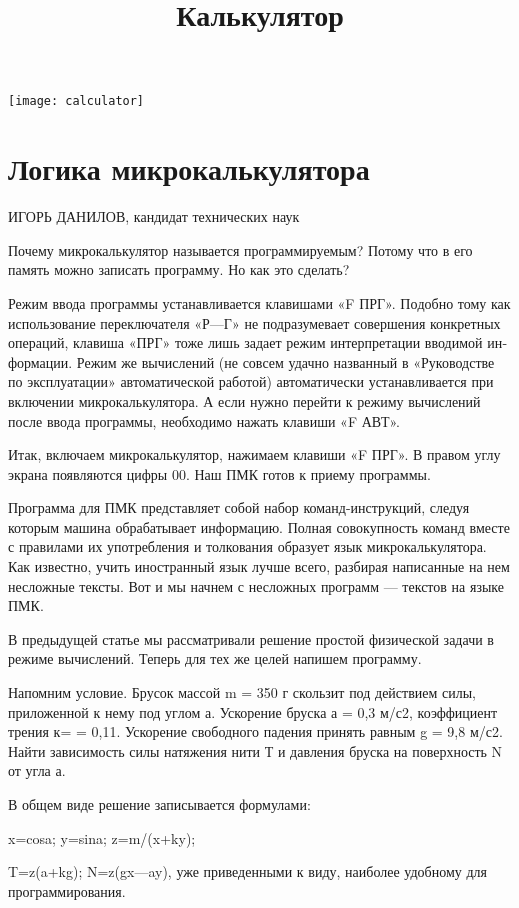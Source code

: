 \documentclass[11pt,a4paper,oneside]{article}
\title{Калькулятор}
\begin{document}
\maketitle
\tableofcontents
\pagebreak

\texttt{[image: calculator]}
\section{Логика микрокалькулятора}
ИГОРЬ ДАНИЛОВ, кандидат технических наук

Почему микрокалькулятор назы­вается программируемым? Потому что в его память можно записать программу. Но как это сделать?

Режим ввода программы устанав­ливается клавишами «F ПРГ». По­добно тому как использование пере­ключателя «Р—Г» не подразумевает совершения конкретных операций, клавиша «ПРГ» тоже лишь задает режим интерпретации вводимой ин­формации. Режим же вычислений (не совсем удачно названный в «Руко­водстве по эксплуатации» автомати­ческой работой) автоматически уста­навливается при включении микро­калькулятора. А если нужно перей­ти к режиму вычислений после вво­да программы, необходимо нажать клавиши «F АВТ».

Итак, включаем микрокалькулятор, нажимаем клавиши «F ПРГ». В пра­вом углу экрана появляются цифры 00. Наш ПМК готов к приему про­граммы.

Программа для ПМК представля­ет собой набор команд-инструкций, следуя которым машина обрабатыва­ет информацию. Полная совокуп­ность команд вместе с правилами их употребления и толкования образует язык микрокалькулятора. Как изве­стно, учить иностранный язык лучше всего, разбирая написанные на нем несложные тексты. Вот и мы начнем с несложных программ — текстов на языке ПМК.

В предыдущей статье мы рассмат­ривали решение простой физической задачи в режиме вычислений. Теперь для тех же целей напишем про­грамму.

Напомним условие. Брусок массой m = 350 г скользит под действием силы, приложенной к нему под уг­лом а. Ускорение бруска а  = 0,3 м/с2, коэффициент трения к= = 0,11. Ускорение свободного паде­ния принять равным g = 9,8 м/с2. Найти зависимость силы натяжения нити Т и давления бруска на поверх­ность N от угла а.

В общем виде решение записывает­ся формулами:

x=cosa; y=sina; z=m/(x+ky);

T=z(a+kg); N=z(gx—ay), уже приведенными к виду, наиболее удобному для программирования.
\end{document}
